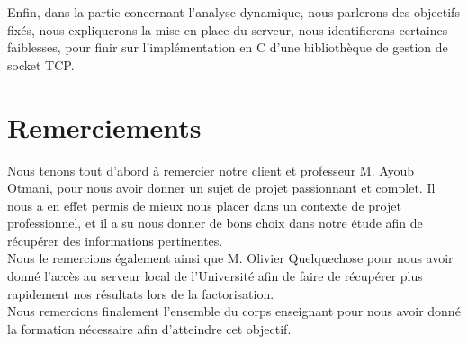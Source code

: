 Enfin, dans la partie concernant l'analyse dynamique, nous parlerons des objectifs fixés, nous expliquerons la mise en place du serveur, nous identifierons certaines faiblesses, pour finir sur l'implémentation en C d'une bibliothèque de gestion de socket TCP.

\section*{Remerciements}

Nous tenons tout d'abord à remercier notre client et professeur M. Ayoub Otmani, pour nous avoir donner un sujet de projet passionnant et complet. Il nous a en effet permis de mieux nous placer dans un contexte de projet professionnel, et il a su nous donner de bons choix dans notre étude afin de récupérer des informations pertinentes.\\

Nous le remercions également ainsi que M. Olivier Quelquechose pour nous avoir donné l'accès au serveur local de l'Université afin de faire de récupérer plus rapidement nos résultats lors de la factorisation.\\

Nous remercions finalement l'ensemble du corps enseignant pour nous avoir donné la formation nécessaire afin d'atteindre cet objectif.